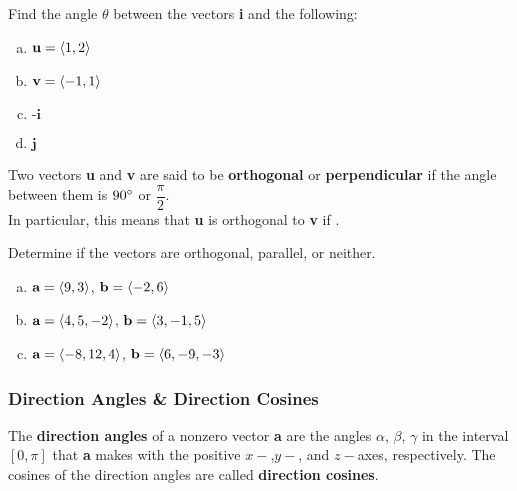\documentclass[notes]{subfiles}
\begin{document}
		\begin{ex}
			Find the angle $\theta$ between the vectors \textbf{i} and the following:
			\begin{enumerate}[(a)]
				\item $\textbf{u} = \left\langle 1,2\right\rangle$
					
				\item $\textbf{v} = \left\langle -1,1\right\rangle$
					
				\item $\textbf{-i}$
					
				\item $\textbf{j}$
			\end{enumerate}
		\end{ex}
			
		\begin{defn}
			Two vectors \textbf{u} and \textbf{v} are said to be \textbf{orthogonal} or \textbf{perpendicular} if the angle between them is $90^\circ$ or $\dfrac{\pi}{2}$.\\[15pt]  In particular, this means that \textbf{u} is orthogonal to \textbf{v} if \blank{3}.
		\end{defn}
			\newpage
			
		\begin{ex}
			Determine if the vectors are orthogonal, parallel, or neither.
			\begin{enumerate}[(a)]
				\item $\textbf{a} = \left\langle 9,3\right\rangle$, $\textbf{b} = \left\langle -2,6\right\rangle$
					\vs{1}
					
				\item $\textbf{a} = \left\langle 4,5,-2\right\rangle$, $\textbf{b} = \left\langle 3,-1,5\right\rangle$
					\vs{1}
					
				\item $\textbf{a} = \left\langle -8,12,4\right\rangle$, $\textbf{b} = \left\langle 6,-9,-3\right\rangle$
					\vs{1}
			\end{enumerate}
		\end{ex}
		
	\subsubsection*{Direction Angles \& Direction Cosines}
		\begin{defn}
			The \textbf{direction angles} of a nonzero vector \textbf{a} are the angles $\alpha$, $\beta$, $\gamma$ in the interval $[0,\pi]$ that \textbf{a} makes with the positive $x-$,$y-$, and $z-$axes, respectively.  The cosines of the direction angles are called \textbf{direction cosines}.
		\end{defn}
			\vs{1}
			\newpage
			
\end{document}
